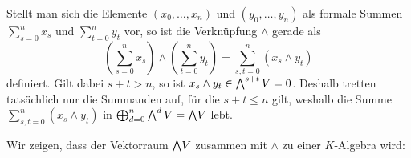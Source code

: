 \begin{remark}
  Stellt man sich die Elemente $(x_0, \dotsc, x_n)$ und $(y_0, \dotsc, y_n)$ als formale Summen $\sum_{s=0}^n x_s$ und $\sum_{t=0}^n y_t$ vor, so ist die Verknüpfung $\wedge$ gerade als
  \[
      \left( \sum_{s=0}^n x_s \right) \wedge \left( \sum_{t=0}^n y_t \right)
    = \sum_{s,t = 0}^n (x_s \wedge y_t)
  \]
  definiert.
  Gilt dabei $s + t > n$, so ist $x_s \wedge y_t \in \bigwedge^{s+t} V = 0$.
  Deshalb tretten tatsächlich nur die Summanden auf, für die $s + t \leq n$ gilt, weshalb die Summe $\sum_{s,t = 0}^n (x_s \wedge y_t)$ in $\bigoplus_{d=0}^n \bigwedge^{d} V = \bigwedge\!V$ lebt.
\end{remark}

Wir zeigen, dass der Vektorraum $\bigwedge\!V$ zusammen mit $\wedge$ zu einer $K$-Algebra wird:

